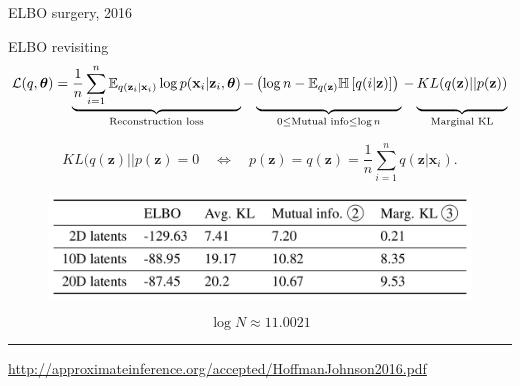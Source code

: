 \documentclass{beamer}
\newcommand{\bx}{\mathbf{x}}
\newcommand{\bz}{\mathbf{z}}
\newcommand{\btheta}{\boldsymbol{\theta}}
\begin{document}
\begin{frame}{ELBO surgery, 2016}
\begin{block}{ELBO revisiting}
\vspace{-0.3cm}
{\footnotesize
\[
    \mathcal{L}(q, \btheta) = \underbrace{\frac{1}{n} \sum_{i=1}^n \mathbb{E}_{q(\bz_i | \bx_i)} \log p(\bx_i | \bz_i, \btheta)}_{\text{Reconstruction loss}} - \underbrace{\left(\log n - \mathbb{E}_{q(\bz)} \mathbb{H} \left[ q(i | \bz) \right] \right)\vphantom{\sum_{i=1}}}_{0 \leq \text{Mutual info} \leq \log n } - \underbrace{KL(q(\bz) || p(\bz))\vphantom{\sum_{i=1}}}_{\text{Marginal KL}}
\]}
\end{block}
\vspace{-0.3cm}
\[
    KL(q(\bz) || p(\bz) = 0 \quad \Leftrightarrow \quad p (\bz) = q(\bz) = \frac{1}{n} \sum_{i=1}^n q(\bz | \bx_i).
\]
\begin{figure}
    \centering
    \includegraphics[width=0.8\linewidth]{figs/ELBO_surgery.png}
\end{figure}
\[
\log N \approx 11.0021
\]
\vfill
\hrule\medskip
{\scriptsize \href{http://approximateinference.org/accepted/HoffmanJohnson2016.pdf}{http://approximateinference.org/accepted/HoffmanJohnson2016.pdf}}
\end{frame}
\end{document}
